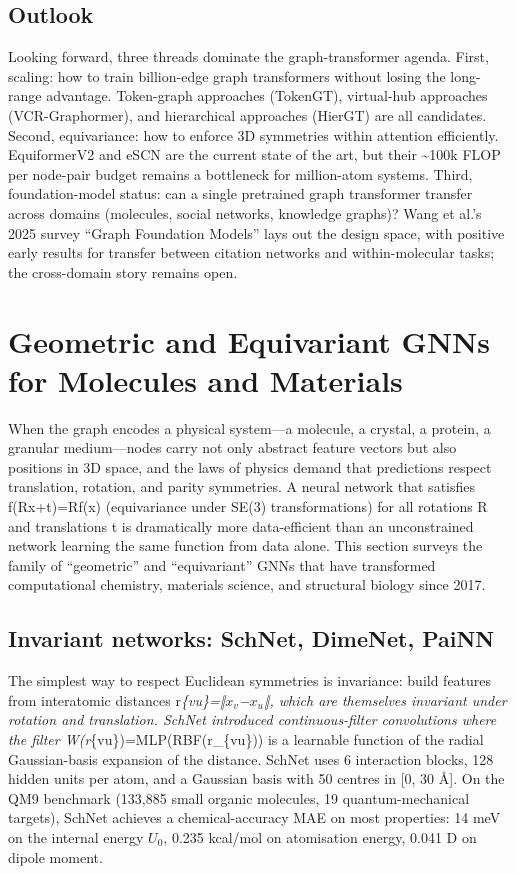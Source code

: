 \documentclass{article}
\begin{document}
\subsection{Outlook}\label{outlook}

Looking forward, three threads dominate the graph-transformer agenda. First, scaling: how to train billion-edge graph transformers without losing the long-range advantage. Token-graph approaches (TokenGT), virtual-hub approaches (VCR-Graphormer), and hierarchical approaches (HierGT) are all candidates. Second, equivariance: how to enforce 3D symmetries within attention efficiently. EquiformerV2 and eSCN are the current state of the art, but their \textasciitilde100k FLOP per node-pair budget remains a bottleneck for million-atom systems. Third, foundation-model status: can a single pretrained graph transformer transfer across domains (molecules, social networks, knowledge graphs)? Wang et al.'s 2025 survey ``Graph Foundation Models'' lays out the design space, with positive early results for transfer between citation networks and within-molecular tasks; the cross-domain story remains open.
\section{Geometric and Equivariant GNNs for Molecules and Materials}\label{sec:geometric-and-equivariant-gnns-for-molecules-and-materials}
When the graph encodes a physical system---a molecule, a crystal, a protein, a granular medium---nodes carry not only abstract feature vectors but also positions in 3D space, and the laws of physics demand that predictions respect translation, rotation, and parity symmetries. A neural network that satisfies f(Rx+t)=Rf(x) (equivariance under SE(3) transformations) for all rotations R and translations t is dramatically more data-efficient than an unconstrained network learning the same function from data alone. This section surveys the family of ``geometric'' and ``equivariant'' GNNs that have transformed computational chemistry, materials science, and structural biology since 2017.

\subsection{Invariant networks: SchNet, DimeNet, PaiNN}\label{invariant-networks-schnet-dimenet-painn}

The simplest way to respect Euclidean symmetries is invariance: build features from interatomic distances r\emph{\{vu\}=‖\(x_v\)−\(x_u\)‖, which are themselves invariant under rotation and translation. SchNet \citep{schtt2017schnetacontinuousf} introduced continuous-filter convolutions where the filter W(r}\{vu\})=MLP(RBF(r\_\{vu\})) is a learnable function of the radial Gaussian-basis expansion of the distance. SchNet uses 6 interaction blocks, 128 hidden units per atom, and a Gaussian basis with 50 centres in {[}0, 30 Å{]}. On the QM9 benchmark (133,885 small organic molecules, 19 quantum-mechanical targets), SchNet achieves a chemical-accuracy MAE on most properties: 14 meV on the internal energy \(U_0\), 0.235 kcal/mol on atomisation energy, 0.041 D on dipole moment.
\end{document}
